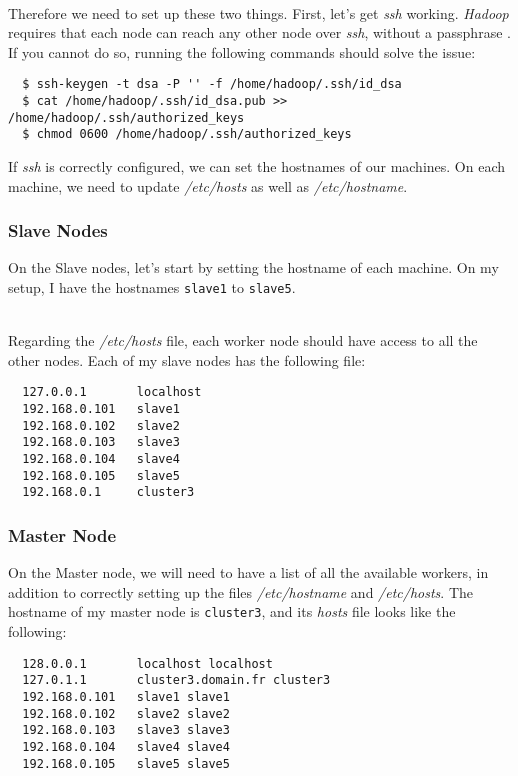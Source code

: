 \documentclass[a4paper, 12pt]{article}
\begin{document}
~\\
Therefore we need to set up these two things. First, let's get \textit{ssh} working. \textit{Hadoop} requires that each node can reach any other node over \textit{ssh}, without a passphrase \cite{hadoop_single_node_setup}. If you cannot do so, running the following commands should solve the issue:

\begin{verbatim}
  $ ssh-keygen -t dsa -P '' -f /home/hadoop/.ssh/id_dsa
  $ cat /home/hadoop/.ssh/id_dsa.pub >> /home/hadoop/.ssh/authorized_keys
  $ chmod 0600 /home/hadoop/.ssh/authorized_keys
\end{verbatim}

If \textit{ssh} is correctly configured, we can set the hostnames of our machines. On each machine, we need to update \textit{/etc/hosts} as well as \textit{/etc/hostname}.

    \subsubsection{Slave Nodes}
    
On the Slave nodes, let's start by setting the hostname of each machine. On my setup, I have the hostnames \texttt{slave1} to \texttt{slave5}.

~\\
Regarding the \textit{/etc/hosts} file, each worker node should have access to all the other nodes. Each of my slave nodes has the following file:

\begin{verbatim}
  127.0.0.1       localhost
  192.168.0.101   slave1
  192.168.0.102   slave2
  192.168.0.103   slave3
  192.168.0.104   slave4
  192.168.0.105   slave5
  192.168.0.1     cluster3
\end{verbatim}

    \subsubsection{Master Node}
    
On the Master node, we will need to have a list of all the available workers, in addition to correctly setting up the files \textit{/etc/hostname} and \textit{/etc/hosts}. The hostname of my master node is \texttt{cluster3}, and its \textit{hosts} file looks like the following:

\begin{verbatim}
  128.0.0.1       localhost localhost
  127.0.1.1       cluster3.domain.fr cluster3
  192.168.0.101   slave1 slave1
  192.168.0.102   slave2 slave2
  192.168.0.103   slave3 slave3
  192.168.0.104   slave4 slave4
  192.168.0.105   slave5 slave5
\end{verbatim}
\end{document}
